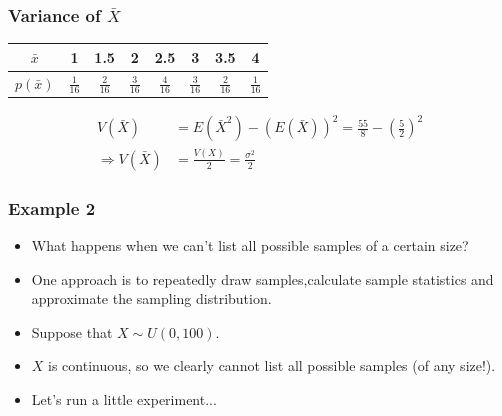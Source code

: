 \documentclass[12pt]{beamer}
\begin{document}
\begin{frame}
	\frametitle{Variance of $\bar{X}$}
	
	\vspace{0.5cm}
	
	\begin{table}
		\centering
		\begin{tabular}{cccccccc}
			\toprule
			$\bar{x}$ & 1 & 1.5 & 2 & 2.5 & 3 & 3.5 & 4 \\
			\midrule
			$p(\bar{x})$ & $\frac{1}{16}$ & $\frac{2}{16}$ & $\frac{3}{16}$ & $\frac{4}{16}$ & $\frac{3}{16}$ & $\frac{2}{16}$ & $\frac{1}{16}$ \\
			\bottomrule
		\end{tabular}
	\end{table}
	
	\vspace{1cm}
	
	\begin{align*}
		V(\bar{X}) &= E(\bar{X}^2)-(E(\bar{X}))^2=\frac{55}{8}-(\frac{5}{2})^2 \\[1em]
		\Rightarrow V(\bar{X}) &= \frac{V(X)}{2} = \frac{\sigma^2}{2}
	\end{align*}
	
\end{frame}

\begin{frame}
	\frametitle{Example 2}
	
	\begin{itemize}[label={\color{blue}$\blacktriangleright$}]
		\item What happens when we can't list all possible samples of a certain size?
		\item One approach is to repeatedly draw samples,calculate sample statistics and approximate the sampling distribution.
		\item Suppose that $X\sim U(0,100)$.
		\item $X$ is continuous, so we clearly cannot list all possible samples (of any size!).
		\item Let's run a little experiment...
	\end{itemize}
	
\end{frame}
\end{document}
